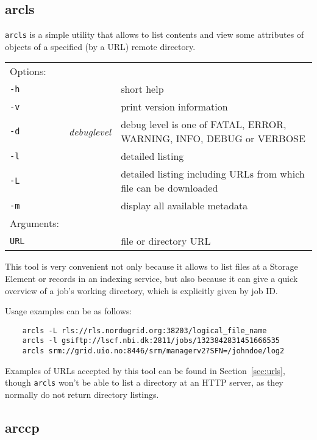 \subsection{arcls}\label{sec:arcls}
\texttt{arcls} is a simple
utility that allows to list contents and view some attributes of
objects of a specified (by a URL) remote directory.

\hspace*{0.5cm}
\begin{shaded}
\end{shaded}
\begin{longtable}{llp{8cm}}
    Options:&&\\
    \texttt{-h} && short help\\
    \texttt{-v} && print version information\\
    \texttt{-d} & \textit{debuglevel} &debug level is one of  FATAL, ERROR, WARNING, INFO, DEBUG or VERBOSE\\
    \texttt{-l} &  & detailed listing\\
    \texttt{-L} &  & detailed listing including URLs from which file can 
    be downloaded\\
    \texttt{-m} && display all available metadata\\
    Arguments:&&\\
    \texttt{URL} && file or directory URL\\
\end{longtable}

This tool is very convenient not only because it allows to list files
at a Storage Element or records in an indexing service, but also
because it can give a quick overview of a job's working directory,
which is explicitly given by job ID.

Usage examples can be as follows:

\begin{verbatim}
    arcls -L rls://rls.nordugrid.org:38203/logical_file_name
    arcls -l gsiftp://lscf.nbi.dk:2811/jobs/1323842831451666535
    arcls srm://grid.uio.no:8446/srm/managerv2?SFN=/johndoe/log2
\end{verbatim}

Examples of URLs accepted by this tool can be found in
Section~\ref{sec:urls}, though \texttt{arcls} won't be able to list a
directory at an HTTP server, as they normally do not return directory
listings.

\subsection{arccp}\label{sec:arccp}

